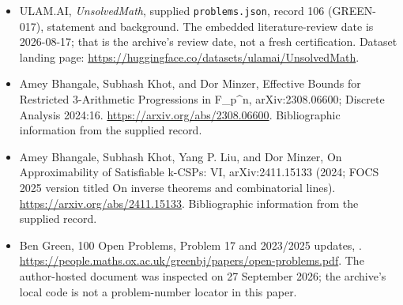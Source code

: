 \documentclass[11pt,a4paper]{article}
\begin{document}
{\small

\begin{itemize}

\item[\hypertarget{source:106:1}{S1}] ULAM.AI, \emph{UnsolvedMath}, supplied \texttt{problems.json}, record 106 (GREEN-017), statement and background. The embedded literature-review date is 2026-08-17; that is the archive’s review date, not a fresh certification. Dataset landing page: \url{https://huggingface.co/datasets/ulamai/UnsolvedMath}.

\item[\hypertarget{source:106:2}{S2}] Amey Bhangale, Subhash Khot, and Dor Minzer, Effective Bounds for Restricted 3-Arithmetic Progressions in F\_p\textasciicircum{}n, arXiv:2308.06600; Discrete Analysis 2024:16. \url{https://arxiv.org/abs/2308.06600}. Bibliographic information from the supplied record.

\item[\hypertarget{source:106:3}{S3}] Amey Bhangale, Subhash Khot, Yang P. Liu, and Dor Minzer, On Approximability of Satisfiable k-CSPs: VI, arXiv:2411.15133 (2024; FOCS 2025 version titled On inverse theorems and combinatorial lines). \url{https://arxiv.org/abs/2411.15133}. Bibliographic information from the supplied record.

\item[\hypertarget{source:106:4}{S4}] Ben Green, 100 Open Problems, Problem 17 and 2023/2025 updates, . \url{https://people.maths.ox.ac.uk/greenbj/papers/open-problems.pdf}. The author-hosted document was inspected on 27 September 2026; the archive’s local code is not a problem-number locator in this paper.

\end{itemize}

}

\label{end:106}
\end{document}
